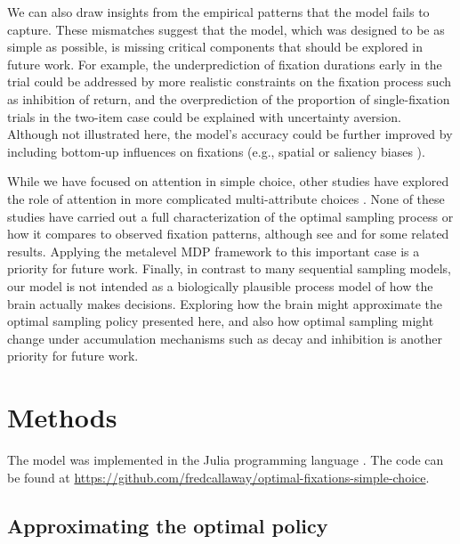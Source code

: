 We can also draw insights from the empirical patterns that the model fails to capture. These mismatches suggest that the model, which was designed to be as simple as possible, is missing critical components that should be explored in future work. For example, the underprediction of fixation durations early in the trial could be addressed by more realistic constraints on the fixation process such as inhibition of return, and the overprediction of the proportion of single-fixation trials in the two-item case could be explained with uncertainty aversion. Although not illustrated here, the model's accuracy could be further improved by including bottom-up influences on fixations (e.g., spatial or saliency biases \citealp{towal2013simultaneous,itti2000saliencybased}).

While we have focused on attention in simple choice, other studies have explored the role of attention in more complicated multi-attribute choices \citep{roe2001multialternative,noguchi2018multialternative,russo1983strategies,trueblood2014multiattribute,usher2004loss,berkowitsch2014rigorously,fisher2017attentional,krajbich2012attentional,westbrook2020dopamine,shi2013information,manohar2013attention}. None of these studies have carried out a full characterization of the optimal sampling process or how it compares to observed fixation patterns, although see \citet{gabaix2006costly} and \citet{yang2015bounded} for some related results. Applying the metalevel MDP framework to this important case is a priority for future work. Finally, in contrast to many sequential sampling models, our model is not intended as a biologically plausible process model of how the brain actually makes decisions. Exploring how the brain might approximate the optimal sampling policy presented here, and also how optimal sampling might change under accumulation mechanisms such as decay and inhibition is another priority for future work.
 
\section{Methods}

The model was implemented in the Julia programming language \citep{bezanson2017julia}. The code can be found at \linebreak \url{https://github.com/fredcallaway/optimal-fixations-simple-choice}.


\subsection{Approximating the optimal policy}\label{sec:attention-policy}


